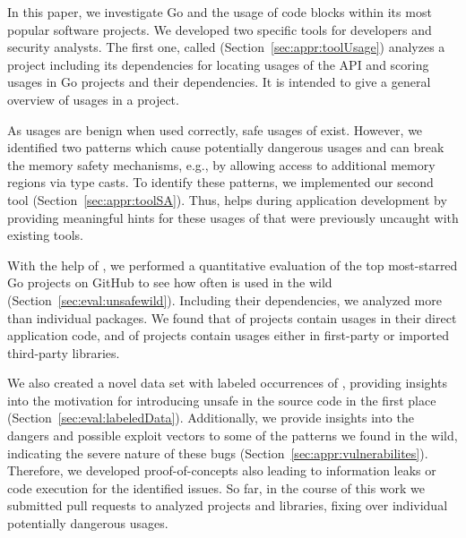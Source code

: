 In this paper, we investigate Go and the usage of \unsafe{} code blocks within its most popular software projects. 
We developed two specific tools for developers and security analysts.
The first one, called \toolUsage{} (Section~\ref{sec:appr:toolUsage}) analyzes a project including its dependencies for locating usages of the \unsafe{} API and scoring \unsafe{} usages in Go projects and their dependencies. 
It is intended to give a general overview of \unsafe{} usages in a project. %

As \unsafe{} usages are benign when used correctly, safe usages of \unsafe{} exist.
However, we identified two patterns which cause potentially dangerous \unsafe{} usages and can break the memory safety mechanisms, e.g., by allowing access to additional memory regions via type casts.
To identify these patterns, we implemented our second tool \toolSA{} (Section~\ref{sec:appr:toolSA}).
Thus, \toolSA{} helps during application development by providing meaningful hints for these usages of \unsafe{} that were previously uncaught with existing tools.

With the help of \toolUsage{}, we performed a quantitative evaluation of the top \initalProjs{} most-starred Go projects on GitHub to see how often \unsafe{} is used in the wild (Section~\ref{sec:eval:unsafewild}). 
Including their dependencies, we analyzed more than \packagesAnalyzedRounded{} individual packages. %
We found that \percentageProjectsWithUnsafe{} of projects contain \unsafe{} usages in their direct application code, and \percentageProjectsAndDependenciesUnsafe{} of
projects contain \unsafe{} usages either in first-party or imported third-party libraries.

We also created a novel data set with  labeled occurrences of \unsafe{}, providing insights into the motivation for introducing unsafe in the source code in the first place (Section~\ref{sec:eval:labeledData}). 
Additionally, we provide insights into the dangers and possible exploit vectors to some of the patterns we found in the wild, indicating the severe nature of these bugs (Section~\ref{sec:appr:vulnerabilites}). 
Therefore, we developed proof-of-concepts also leading to information leaks or code execution for the identified issues. 
So far, in the course of this work we submitted \numberPRs{} pull requests to analyzed projects and libraries, fixing over \numberBugsFixed{} individual potentially dangerous \unsafe{} usages.

